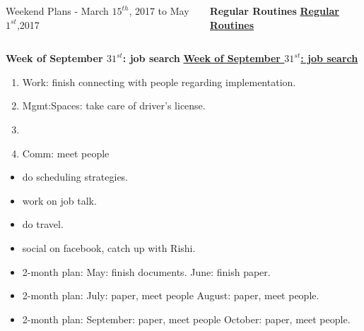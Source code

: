 \begin{columns}
\begin{column}{0.5\columnwidth}
\begin{block}{Weekend Plans - March $15^{th}$, 2017 to May $1^{st}$,2017}
\ifdefined\POSTER
\end{block}
\end{column}
\fi


\ifdefined\POSTER
\begin{column}{0.28\linewidth}
\begin{block}{\small \bf Regular Routines}
\else
\underline{\bf Regular Routines}\\ 
\fi 

%


\ifdefined\POSTER
\end{block}
\end{column}%
\fi

\ifdefined\POSTER
\end{columns}
\fi
\ifdefined\POSTER
\begin{block}{\small \bf Week of September $31^{st}$: job search}
\else
\underline{\bf Week of September $31^{st}$: job search}\\
\fi

\begin{enumerate}
\tiny \item \tiny Work: finish connecting with people regarding implementation. 
\item \tiny Mgmt:Spaces: take care of driver's license. 
\item \tiny 
\item \tiny Comm: meet people 
\end{enumerate}

\ifdefined\POSTER
\end{block}
\fi
\begin{minipage}{0.5\textwidth}
\begin{itemize}
\tiny \item \tiny do scheduling strategies.
\item \tiny work on job talk.
\item \tiny do travel.
\item \tiny social on facebook, catch up with Rishi.
\end{itemize}
\begin{itemize}
\item \tiny 2-month plan: May: finish documents.  June:  finish paper.
\item \tiny 2-month plan: July: paper, meet people  August: paper, meet people.
\item \tiny 2-month plan: September: paper, meet people  October: paper, meet people.
\end{itemize}
\end{minipage}

